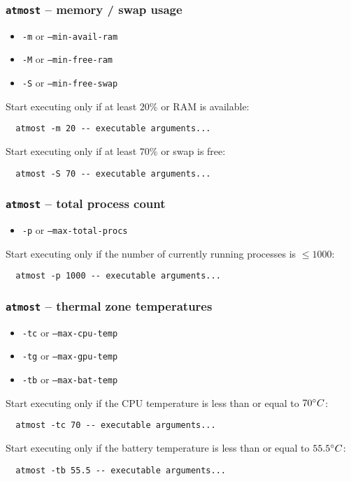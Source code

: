 \documentclass[compress,table,xcolor=table]{beamer}
\newcommand{\shelltext}[1]{\texttt{\colorbox{light-gray}{#1}}}
\begin{document}
\begin{frame}[fragile]
  \frametitle{\shelltext{atmost} -- memory / swap usage}
  \begin{itemize}
    \item \shelltext{-m} or \shelltext{--min-avail-ram}
    \item \shelltext{-M} or \shelltext{--min-free-ram}
    \item \shelltext{-S} or \shelltext{--min-free-swap}
  \end{itemize}

  \large
  Start executing only if at least $20\%$ or RAM is available:
  \normalsize
  \begin{lstlisting}
  atmost -m 20 -- executable arguments...
  \end{lstlisting}

  \large
  Start executing only if at least $70\%$ or swap is free:
  \normalsize
  \begin{lstlisting}
  atmost -S 70 -- executable arguments...
  \end{lstlisting}
\end{frame}
\begin{frame}[fragile]
  \frametitle{\shelltext{atmost} -- total process count}
  \begin{itemize}
    \item \shelltext{-p} or \shelltext{--max-total-procs}
  \end{itemize}

  \large
  Start executing only if the number of currently running processes is $\leq 1000$:
  \normalsize
  \begin{lstlisting}
  atmost -p 1000 -- executable arguments...
  \end{lstlisting}
\end{frame}
\begin{frame}[fragile]
  \frametitle{\shelltext{atmost} -- thermal zone temperatures}
  \begin{itemize}
    \item \shelltext{-tc} or \shelltext{--max-cpu-temp}
    \item \shelltext{-tg} or \shelltext{--max-gpu-temp}
    \item \shelltext{-tb} or \shelltext{--max-bat-temp}
  \end{itemize}

  \large
  Start executing only if the CPU temperature is less than or equal
  to $70\degree C$:
  \normalsize
  \begin{lstlisting}
  atmost -tc 70 -- executable arguments...
  \end{lstlisting}

  \large
  Start executing only if the battery temperature is less than or equal
  to $55.5\degree C$:
  \normalsize
  \begin{lstlisting}
  atmost -tb 55.5 -- executable arguments...
  \end{lstlisting}
\end{frame}
\end{document}
